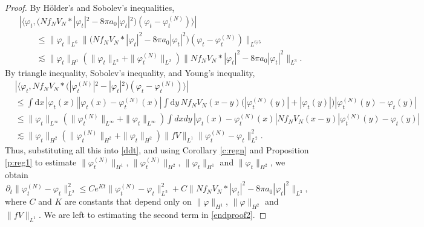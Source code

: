 \documentclass[11pt,a4paper,draft,DIV11]{scrartcl}	%
\newcommand{\di}{\textrm{d}}		%
\begin{document}
\begin{proof}
  By H\"older's and Sobolev's inequalities,
  \begin{align*}
    & |\langle \varphi_t, \big(N f_N V_N * |\varphi_t|^2 - 8 \pi a_0
    |\varphi_t|^2\big) (\varphi_t - \varphi_t^{(N)}) \rangle| \\
    & \qquad \le \| \varphi_t \|_{L^6} \| \big(N f_N V_N * |\varphi_t|^2 - 8 \pi
    a_0 |\varphi_t|^2\big) (\varphi_t - \varphi_t^{(N)}) \|_{L^{6/5}} \\
    & \qquad \apprle \| \varphi_t \|_{H^1} (\| \varphi_t \|_{L^2} + \|
    \varphi_t^{(N)} \|_{L^2}) \| N f_N V_N * |\varphi_t|^2 - 8 \pi a_0
    |\varphi_t|^2 \|_{L^3}.
  \end{align*}
  By triangle inequality, Sobolev's inequality, and Young's inequality,
  \begin{align*}
    & |\langle \varphi_t, N f_N V_N * \big(|\varphi_t^{(N)}|^2 -
    |\varphi_t|^2\big) (\varphi_t - \varphi_t^{(N)}) \rangle| \\
    & \le \int \di x\, |\varphi_t(x)| |\varphi_t(x) - \varphi_t^{(N)}(x)|
    \int \di y\, N f_N V_N(x-y) \big(|\varphi_t^{(N)}(y)| +
    |\varphi_t(y)|\big) |\varphi_t^{(N)}(y) - \varphi_t(y)| \\
    & \le \| \varphi_t \|_{L^\infty} ( \| \varphi_t^{(N)} \|_{L^\infty} + \|
    \varphi_t \|_{L^\infty} ) \int dx dy \, |\varphi_t(x) -
    \varphi_t^{(N)}(x)| N f_N V_N(x-y) |\varphi_t^{(N)}(y) - \varphi_t(y)|
    \\
    & \apprle \| \varphi_t \|_{H^2} ( \| \varphi_t^{(N)} \|_{H^2} + \|
    \varphi_t \|_{H^2} ) \| fV \|_{L^1} \| \varphi_t^{(N)} - \varphi_t
    \|_{L^2}^2.
  \end{align*}
  Thus, substituting all this into \eqref{ddt}, and using Corollary
  \ref{c:regn} and Proposition \ref{p:reg1} to estimate $\| \varphi_t^{(N)}
  \|_{H^1}$, $\|
  \varphi_t^{(N)} \|_{H^2}$, $\| \varphi_t \|_{H^1}$ and $\| \varphi_t
  \|_{H^2}$, we obtain
  \begin{equation} \label{endproof2}
    \partial_t \| \varphi_t^{(N)} - \varphi_t \|_{L^2}^2 \le C e^{Kt} \|
    \varphi_t^{(N)} - \varphi_t \|_{L^2}^2 + C \| N f_N V_N * |\varphi_t|^2
    - 8 \pi a_0 |\varphi_t|^2 \|_{L^3},
  \end{equation}
  where $C$ and $K$ are constants that depend only on $\| \varphi \|_{H^1}$,
  $\| \varphi \|_{H^2}$ and $\| fV \|_{L^1}$. We are left to estimating the
  second term in \eqref{endproof2}.



\end{proof}
\end{document}
